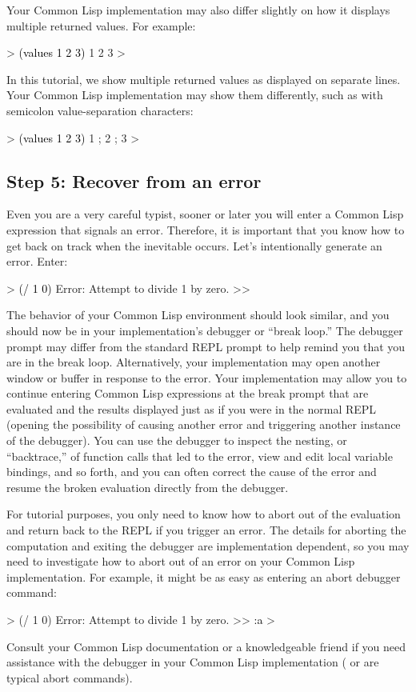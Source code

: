 \documentclass[10pt,twoside,english,pdftex]{article}
\begin{document}
%
Your Common Lisp implementation may also differ slightly on how it displays
multiple returned values.  For example:
%
\begin{example}\color{darkergray}%
  > \textcolor{black}{(values 1 2 3)}
  1
  2
  3
  >
\end{example}
%
In this tutorial, we show multiple returned values as displayed on separate
lines.  Your Common Lisp implementation may show them differently, such as
with semicolon value-separation characters:
%
\begin{example}\color{darkergray}%
  > \textcolor{black}{(values 1 2 3)}
  1 ;
  2 ;
  3
  >
\end{example}

\subsection*{Step 5: Recover from an error}

%
%
Even you are a very careful typist, sooner or later you will enter a Common
Lisp expression that signals an error.  Therefore, it is important that you
know how to get back on track when the inevitable occurs.  Let's intentionally
generate an error.  Enter:
%
\begin{example}\color{darkergray}%
  > \textcolor{black}{(/ 1 0)}
  Error: Attempt to divide 1 by zero.
  >>
\end{example}

The behavior of your Common Lisp environment should look similar, and you
should now be in your implementation's debugger or ``break loop.''  The
debugger prompt may differ from the standard REPL prompt to help remind you
that you are in the break loop.  Alternatively, your implementation may open
another window or buffer in response to the error.  Your implementation may
allow you to continue entering Common Lisp expressions at the break prompt
that are evaluated and the results displayed just as if you were in the normal
REPL (opening the possibility of causing another error and triggering another
instance of the debugger).  You can use the debugger to inspect the nesting,
or ``backtrace,'' of function calls that led to the error, view and edit local
variable bindings, and so forth, and you can often correct the cause of the
error and resume the broken evaluation directly from the debugger.

For tutorial purposes, you only need to know how to abort out of the
evaluation and return back to the REPL if you trigger an error.  The details
for aborting the computation and exiting the debugger are implementation
dependent, so you may need to investigate how to abort out of an error on your
Common Lisp implementation.  For example, it might be as easy as entering an
abort debugger command:
%
\begin{example}\color{darkergray}%
  > (/ 1 0)
  Error: Attempt to divide 1 by zero.
  >> \textcolor{black}{:a}
  >
\end{example}
%
Consult your Common Lisp documentation or a knowledgeable friend if
you need assistance with the debugger in your Common Lisp
implementation ( or  are typical abort commands).
\end{document}

